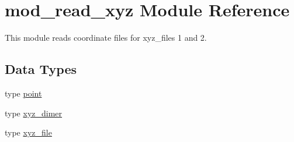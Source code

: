 \hypertarget{namespacemod__read__xyz}{}\section{mod\+\_\+read\+\_\+xyz Module Reference}
\label{namespacemod__read__xyz}


This module reads coordinate files for xyz\+\_\+files 1 and 2.  


\subsection*{Data Types}
\begin{DoxyCompactItemize}
\item 
type \hyperlink{structmod__read__xyz_1_1point}{point}
\item 
type \hyperlink{structmod__read__xyz_1_1xyz__dimer}{xyz\+\_\+dimer}
\item 
type \hyperlink{structmod__read__xyz_1_1xyz__file}{xyz\+\_\+file}
\end{DoxyCompactItemize}
